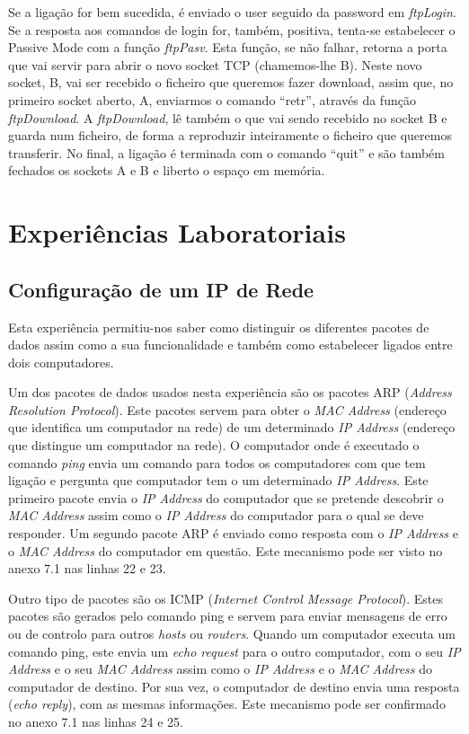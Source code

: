 \documentclass[a4paper]{article}
\begin{document}
Se a ligação for bem sucedida, é enviado o user seguido da password em \textit{ftpLogin}. Se a resposta aos comandos de login for, também, positiva, tenta-se estabelecer o Passive Mode com a função \textit{ftpPasv}. Esta função, se não falhar, retorna a porta que vai servir para abrir o novo socket TCP (chamemos-lhe B). Neste novo socket, B, vai ser recebido o ficheiro que queremos fazer download, assim que, no primeiro socket aberto, A, enviarmos o comando “retr”, através da função \textit{ftpDownload}. A \textit{ftpDownload}, lê também o que vai sendo recebido no socket B e guarda num ficheiro, de forma a reproduzir inteiramente o ficheiro que queremos transferir.
No final, a ligação é terminada com o comando “quit” e são também fechados os sockets A e B e liberto o espaço em memória.

\section{Experiências Laboratoriais}
\subsection{Configuração de um IP de Rede}
Esta experiência permitiu-nos saber como distinguir os diferentes pacotes de dados assim como a sua funcionalidade e também como estabelecer ligados entre dois computadores.

Um dos pacotes de dados usados nesta experiência são os pacotes ARP (\textit{Address Resolution Protocol}). Este pacotes servem para obter o \textit{MAC Address} (endereço que identifica um computador na rede) de um determinado \textit{IP Address} (endereço que distingue um computador na rede). O computador onde é executado o comando \textit{ping} envia um comando para todos os computadores com que tem ligação e pergunta que computador tem o um determinado \textit{IP Address}. Este primeiro pacote envia o \textit{IP Address} do computador que se pretende descobrir o \textit{MAC Address} assim como o \textit{IP Address} do computador para o qual se deve responder. Um segundo pacote ARP é enviado como resposta com o \textit{IP Address} e o \textit{MAC Address} do computador em questão. Este mecanismo pode ser visto no anexo 7.1 nas linhas 22 e 23.

Outro tipo de pacotes são os ICMP (\textit{Internet Control Message Protocol}). Estes pacotes são gerados pelo comando ping e servem para enviar mensagens de erro ou de controlo para outros \textit{hosts} ou \textit{routers}. Quando um computador executa um comando ping, este envia um \textit{echo request} para o outro computador, com o seu \textit{IP Address} e o seu \textit{MAC Address} assim como o \textit{IP Address} e o \textit{MAC Address} do computador de destino. Por sua vez, o computador de destino envia uma resposta (\textit{echo reply}), com as mesmas informações. Este mecanismo pode ser confirmado no anexo 7.1 nas linhas 24 e 25.
\end{document}
